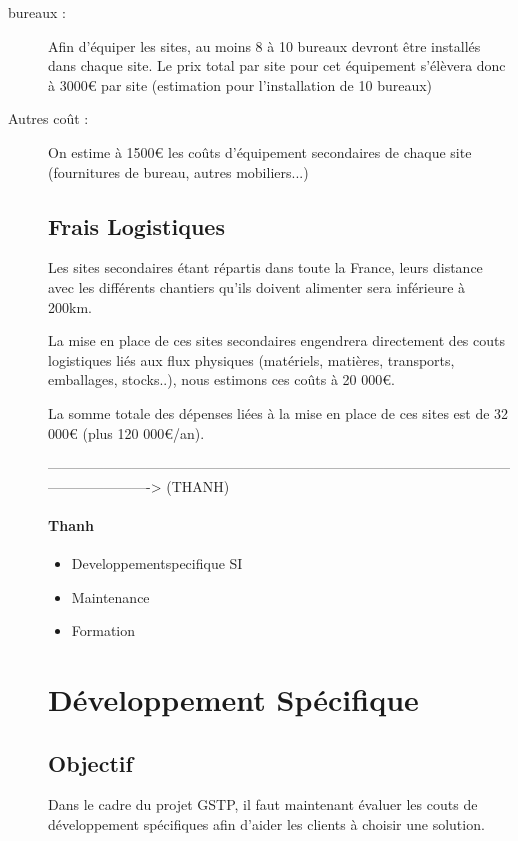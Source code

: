 \begin{description}
	\item[bureaux : ] Afin d'équiper les sites, au moins 8 à 10 bureaux devront être installés dans chaque site. Le prix total par site pour cet équipement s'élèvera donc à 3000€ par site (estimation pour l'installation de 10 bureaux)
	\item[Autres coût :]  On estime à 1500€ les coûts d'équipement secondaires de chaque site (fournitures de bureau, autres mobiliers...)

\subsection{Frais Logistiques}
Les sites secondaires étant répartis dans toute la France, leurs distance avec les différents chantiers qu'ils doivent alimenter sera inférieure à 200km.

La mise en place de ces sites secondaires engendrera directement des couts logistiques liés aux flux physiques (matériels, matières, transports, emballages, stocks..), nous estimons ces coûts à 20 000€.

La somme totale des dépenses liées à la mise en place de ces sites est de 32 000€ (plus 120 000€/an).


-------------------------------------------------------------------------------------------------------------------------> (THANH)
        \paragraph{Thanh}
        \begin{itemize}
            \item Developpementspecifique SI
            \item Maintenance
            \item Formation
        \end{itemize}


\section{Développement Spécifique}
\subsection{Objectif}

Dans le cadre du projet GSTP, il faut maintenant évaluer les couts de développement spécifiques afin d'aider les clients à choisir une solution.



\end{description}
